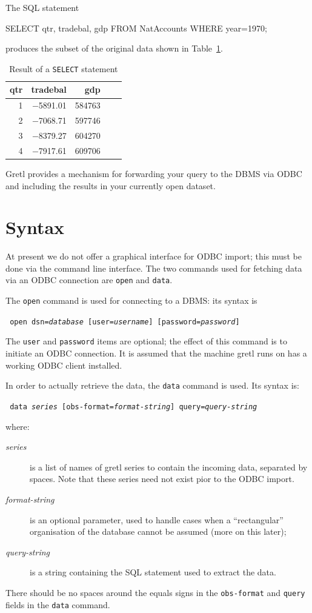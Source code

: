 The SQL statement
\begin{code}
  SELECT qtr, tradebal, gdp FROM NatAccounts WHERE year=1970;
\end{code}
produces the subset of the original data shown in Table~\ref{tab:odbc-result}.

\begin{table}[htbp]
  \centering
  \begin{tabular}{rrrrr}
    \hline
    qtr	& tradebal & gdp    \\ 
    \hline
    1	& $-$5891.01 & 584763 \\ 
    2	& $-$7068.71 & 597746 \\ 
    3	& $-$8379.27 & 604270 \\ 
    4	& $-$7917.61 & 609706  
  \end{tabular}
  \caption{Result of a \texttt{SELECT} statement}
  \label{tab:odbc-result}
\end{table}

Gretl provides a mechanism for forwarding your query to the DBMS
via ODBC and including the results in your currently open dataset.

\section{Syntax}
\label{sec:odbc-syntax}

At present we do not offer a graphical interface for ODBC import; this
must be done via the command line interface. The two commands used for
fetching data via an ODBC connection are \texttt{open} and
\texttt{data}.

The \texttt{open} command is used for connecting to a DBMS: its syntax
is
\begin{flushleft}
\texttt{%
  open dsn=\emph{database} [user=\emph{username}]
  [password=\emph{password}]} 
\end{flushleft}
The \texttt{user} and \texttt{password} items are optional; the effect
of this command is to initiate an ODBC connection. It is assumed that
the machine gretl runs on has a working ODBC client installed.

In order to actually retrieve the data, the \texttt{data} command is
used. Its syntax is:
\begin{flushleft}
\texttt{%
  data \emph{series} [obs-format=\emph{format-string}] query=\emph{query-string}} 
\end{flushleft}
where:
\begin{description}
\item[\emph{series}] is a list of names of gretl series to contain the
  incoming data, separated by spaces.  Note that these series need not
  exist pior to the ODBC import.
\item[\emph{format-string}] is an optional parameter, used to handle
  cases when a ``rectangular'' organisation of the database cannot be
  assumed (more on this later);
\item[\emph{query-string}] is a string containing the SQL statement
  used to extract the data.
\end{description}
%
There should be no spaces around the equals signs in the
\texttt{obs-format} and \texttt{query} fields in the \texttt{data}
command.

